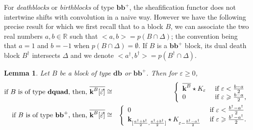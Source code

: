 \documentclass[a4paper, english, 11pt]{article}
\newcommand{\kk}[0]{\textbf{k}}
\newcommand{\0}{\vec{0}}
\newcommand{\R}[0]{\mathbb{R}}
\newtheorem{lem}[prop]{Lemma}
\begin{document}
For \emph{deathblocks} or \emph{birthblocks} of type $\textbf{bb}^{+}$, the sheafification functor does not intertwine shifts with convolution in a naive way. 
However we have the following precise result for which we first 
recall that to a block $B$, we can associate the two real numbers $a,b\in \R$ such that $<a,b> = p(B\cap \Delta)$;  the convention being that $a=1$ and $b=-1$ when $ p(B\cap \Delta) = \emptyset$. 
If $B$ is a $\textbf{bb}^{+}$ block, its dual death block $B^\dagger$ intersects $\Delta$ and we denote $<a^\dagger,b^\dagger> = p(B^\dagger \cap \Delta)$.
\begin{lem}\label{L:Barondeathblocks}Let $B$ be a block of type $\textbf{db}$ or $\textbf{bb}^{+}$.  Then for $\varepsilon \geq 0$,
 \begin{eqnarray}
 \text{if $B$ is of type \textbf{dquad}, then, } \overline{\kk^{B}[\vec{\varepsilon}] }
 & \cong & \left\{ \begin{array}{ll}  \overline{\kk^{B}}\star K_{\varepsilon} & \mbox{ if $\varepsilon< \frac{b-a}{2}$}\\
 0 & \mbox{ if $\varepsilon \geqslant \frac{b-a}{2}$,} \end{array}                                                                                                                          \right .  \label{eq:Barofdb}\\
 \text{if $B$ is of type $\textbf{bb}^{+}$, then, }\overline{\kk^{B}[\vec{\varepsilon}]} 
 & \cong &   \left\{ \begin{array}{ll}  0 & \mbox{ if $\varepsilon< \frac{b^\dagger-a^\dagger}{2}$}\\
 \kk_{[\frac{a^\dagger+b^\dagger}{2}, \frac{a^\dagger+b^\dagger}{2}]}\star K_{\varepsilon -\frac{b^\dagger -a^\dagger}{2}} & \mbox{ if $\varepsilon \geqslant \frac{b^\dagger-a^\dagger}{2}$.} \end{array}                                                                                                                          \right .  \label{eq:Barofbb+}
 \end{eqnarray}
\end{lem}
\end{document}
